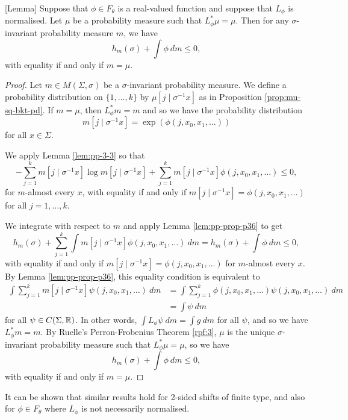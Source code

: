 \begin{lemma}\label{lem:pp-prop-3-4}[Lemma]
	Suppose that $\phi \in F_\theta$ is a real-valued function and suppose that $L_\phi$ is normalised. Let $\mu$ be a probability measure such that $L_\phi^*{\mu} = \mu$. Then for any $\sigma$-invariant probability measure $m$, we have
	\[
		h_m(\sigma) + \int{\phi\ dm} \leq 0,
	\]
	with equality if and only if $m = \mu$.
	\begin{proof}
		Let $m \in M(\Sigma, \sigma)$ be a $\sigma$-invariant probability measure. We define a probability distribution on $\{1, \dots, k\}$ by $\mu[j \mid \sigma^{-1}{x}]$ as in Proposition \ref{prop:mu-sq-bkt-pd}. If $m = \mu$, then $L_\phi^*{m} = m$ and so we have the probability distribution
		\[
			m[j \mid \sigma^{-1}{x}] = \exp(\phi(j, x_0, x_1, \dots))
		\]
		for all $x \in \Sigma$.
		
		We apply Lemma \ref{lem:pp-3-3} so that
		\[
			-\sum_{j = 1}^k{m[j \mid \sigma^{-1}{x}] \log{m[j \mid \sigma^{-1}{x}]}} + \sum_{j = 1}^k{m[j \mid \sigma^{-1}{x}] \phi(j, x_0, x_1, \dots)} \leq 0,
		\]
		for $m$-almost every $x$, with equality if and only if $m[j \mid \sigma^{-1}{x}] = \phi(j, x_0, x_1, \dots)$ for all $j = 1, \dots, k$.
		
		We integrate with respect to $m$ and apply Lemma \ref{lem:pp-prop-p36} to get
		\[
			h_m(\sigma) + \sum_{j = 1}^k{\int{m[j \mid \sigma^{-1}{x}] \phi(j, x_0, x_1, \dots)\ dm}} = h_m(\sigma) + \int{\phi\ dm} \leq 0,
		\]
		with equality if and only if $m[j \mid \sigma^{-1}{x}] = \phi(j, x_0, x_1, \dots)$ for $m$-almost every $x$. By Lemma \ref{lem:pp-prop-p36}, this equality condition is equivalent to
		\begin{align*}
			\int{\sum_{j = 1}^k{m[j \mid \sigma^{-1}{x}] \psi(j, x_0, x_1, \dots)}\ dm} &= \int{\sum_{j = 1}^k{\phi(j, x_0, x_1, \dots) \psi(j, x_0, x_1, \dots)}\ dm} \\
				&= \int{\psi\ dm}
		\end{align*}
		for all $\psi \in C(\Sigma, \mathbb{R})$. In other words, $\int{L_\phi{\psi}\ dm} = \int{g\ dm}$ for all $\psi$, and so we have $L_\phi^*{m} = m$. By Ruelle's Perron-Frobenius Theorem \ref{rpf:3}, $\mu$ is the unique $\sigma$-invariant probability measure such that $L_\phi^*{\mu} = \mu$, so we have
		\[
			h_m(\sigma) + \int{\phi\ dm} \leq 0,
		\]
		with equality if and only if $m = \mu$.
	\end{proof}
\end{lemma}

It can be shown that similar results hold for 2-sided shifts of finite type, and also for $\phi \in F_\theta$ where $L_\phi$ is not necessarily normalised.

